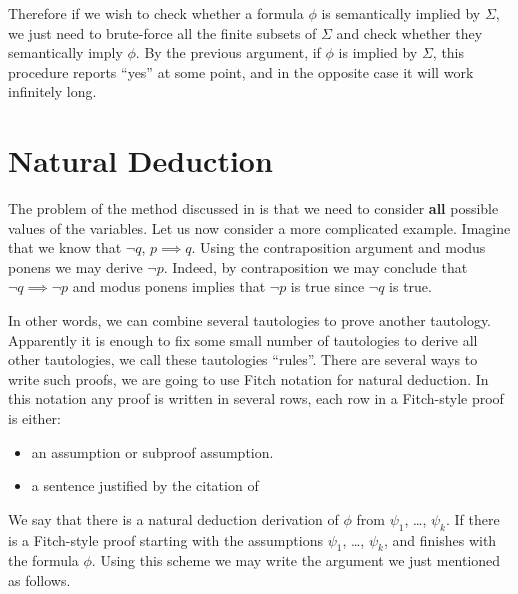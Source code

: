 Therefore if we wish to check whether a formula $\phi$ is semantically implied
by $\Sigma$, we just need to brute-force all the finite subsets of $\Sigma$ and
check whether they semantically imply $\phi$. By the previous argument, if
$\phi$ is implied by $\Sigma$, this procedure reports ``yes'' at some point,
and in the opposite case it will work infinitely long.

\section{Natural Deduction}


The problem of the method discussed in  is that we
need to consider \textbf{all} possible values of the variables. Let us now
consider a more complicated example. Imagine that we know that $\lnot q$,
$p \implies q$. Using the contraposition argument and modus ponens we may derive
$\lnot p$. Indeed, by contraposition we may conclude that
$\lnot q \implies \lnot p$ and modus ponens implies that $\lnot p$ is true since
$\lnot q$ is true.

In other words, we can combine several tautologies to prove another tautology.
Apparently it is enough to fix some small number of tautologies to derive all
other tautologies, we call these tautologies ``rules''. There are several ways
to write such proofs, we are going to use Fitch notation for natural deduction.
In this notation any proof is written in several rows, each row in a Fitch-style
proof is either:
\begin{itemize}
  \item an assumption or subproof assumption.
  \item a sentence justified by the citation of
\end{itemize}
We say that there is a natural deduction derivation of $\phi$ from $\psi_1$,
\dots, $\psi_k$. If there is a Fitch-style proof starting with the assumptions
$\psi_1$, \dots, $\psi_k$, and finishes with the formula $\phi$.
Using this scheme we may write the argument we just mentioned as follows.

